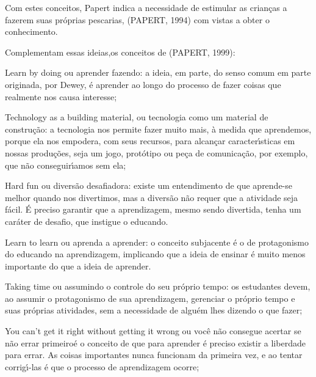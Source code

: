 \documentclass[
12pt,		%
openright,	%
twoside,  %
a4paper,			%
chapter=TITLE,		%
english,			%
french,				%
spanish,			%
brazil				%
]{USPSC-classe/USPSC}
\begin{document}
Com estes conceitos, Papert indica a necessidade de estimular as crian\c{c}as a fazerem suas pr\'oprias pescarias,  (PAPERT, 1994) com vistas a obter o conhecimento.









Complementam essas ideias,os conceitos de (PAPERT, 1999):










\begin{alineas}
\item Learn by doing ou aprender fazendo: a ideia, em parte,  do senso comum em parte originada, por Dewey, \'e aprender ao longo do processo de fazer coisas que realmente nos causa interesse;
\item Technology as a building material, ou \textquotedbl tecnologia como um material de constru\c{c}\~ao\textquotedbl : a tecnologia nos permite fazer muito mais, \`a medida que aprendemos, porque ela nos empodera, com seus recursos, para alcan\c{c}ar caracter\'{\i}sticas em nossas produ\c{c}\~oes, seja um jogo, prot\'otipo ou pe\c{c}a de comunica\c{c}\~ao, por exemplo, que n\~ao conseguir\'{\i}amos sem ela;
\item Hard fun ou \textquotedbl divers\~ao desafiadora\textquotedbl : existe um entendimento de que aprende-se melhor quando nos divertimos, mas a divers\~ao n\~ao requer que a atividade seja f\'acil. \'E preciso garantir que a aprendizagem, mesmo sendo divertida, tenha um car\'ater de desafio, que instigue o educando.
\item Learn to learn ou \textquotedbl aprenda a aprender\textquotedbl : o conceito subjacente \'e o de protagonismo do educando na aprendizagem, implicando que a ideia de ensinar \'e muito menos importante do que a ideia de aprender.
\item Taking time ou \textquotedbl assumindo o controle do seu pr\'oprio tempo\textquotedbl : os estudantes devem, ao assumir o protagonismo de sua aprendizagem, gerenciar o pr\'oprio tempo e suas pr\'oprias atividades, sem a necessidade de algu\'em lhes dizendo o que fazer;
\item You can’t get it right without getting it wrong ou \textquotedbl voc\^e n\~ao consegue acertar
se n\~ao errar primeiro\textquotedbl \'e o conceito de que para aprender \'e preciso existir a
liberdade para errar. As coisas importantes nunca funcionam da primeira vez, e ao tentar corrig\'{\i}-las \'e que o processo de aprendizagem ocorre;

\end{alineas}
\end{document}
